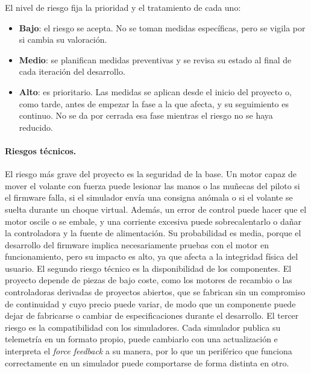 	El nivel de riesgo fija la prioridad y el tratamiento de cada uno:
	
	\begin{itemize}
		\item \textbf{Bajo}: el riesgo se acepta. No se toman medidas específicas, pero se vigila por si cambia su valoración.
		\item \textbf{Medio}: se planifican medidas preventivas y se revisa su estado al final de cada iteración del desarrollo.
		\item \textbf{Alto}: es prioritario. Las medidas se aplican desde el inicio del proyecto o, como tarde, antes de empezar la fase a la que afecta, y su seguimiento es continuo. No se da por cerrada esa fase mientras el riesgo no se haya reducido.
	\end{itemize}


\paragraph{Riesgos técnicos.}
El riesgo más grave del proyecto es la seguridad de la base. Un motor capaz de mover el volante con fuerza puede lesionar las manos o las muñecas del piloto si el firmware falla, si el simulador envía una consigna anómala o si el volante se suelta durante un choque virtual. Además, un error de control puede hacer que el motor oscile o se embale, y una corriente excesiva puede sobrecalentarlo o dañar la controladora y la fuente de alimentación. Su probabilidad es media, porque el desarrollo del firmware implica necesariamente pruebas con el motor en funcionamiento, pero su impacto es alto, ya que afecta a la integridad física del usuario. El segundo riesgo técnico es la disponibilidad de los componentes. El proyecto depende de piezas de bajo coste, como los motores de recambio o las controladoras derivadas de proyectos abiertos, que se fabrican sin un compromiso de continuidad y cuyo precio puede variar, de modo que un componente puede dejar de fabricarse o cambiar de especificaciones durante el desarrollo. El tercer riesgo es la compatibilidad con los simuladores. Cada simulador publica su telemetría en un formato propio, puede cambiarlo con una actualización e interpreta el \textit{force feedback} a su manera, por lo que un periférico que funciona correctamente en un simulador puede comportarse de forma distinta en otro.

